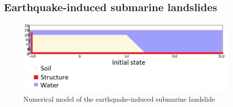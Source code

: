 \documentclass[preprint,12pt]{elsarticle}
\begin{document}
\subsection{\textsf{Earthquake-induced submarine landslides}}
%
%
\begin{figure}[H]
\center
\includegraphics[scale=0.5]{schematic.jpeg}
\caption{Numerical model of the earthquake-induced submarine landslide}
\label{fig:scheme}
\end{figure}
%
%
\end{document}

